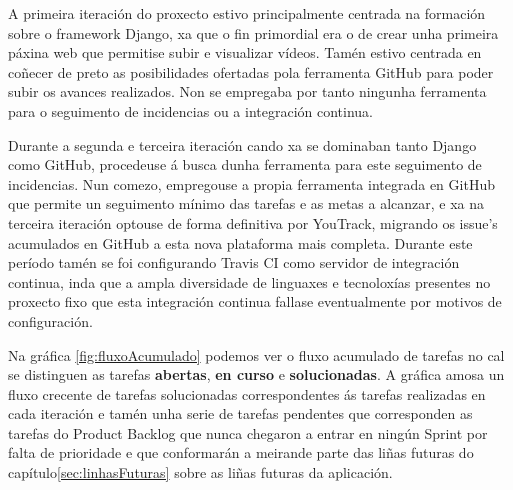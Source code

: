A primeira iteración do proxecto estivo principalmente centrada na formación sobre o framework
Django, xa que o fin primordial era o de crear unha primeira páxina web que permitise subir e 
visualizar vídeos. Tamén estivo centrada en coñecer de preto as posibilidades ofertadas pola
ferramenta GitHub para poder subir os avances realizados. Non se empregaba por tanto ningunha
ferramenta para o seguimento de incidencias ou a integración continua.

Durante a segunda e terceira iteración cando xa se dominaban tanto Django como GitHub, 
procedeuse á busca dunha ferramenta para este seguimento de incidencias. Nun comezo, empregouse
a propia ferramenta integrada en GitHub que permite un seguimento mínimo das tarefas e as metas
a alcanzar, e xa na terceira iteración optouse de forma definitiva por YouTrack, migrando os 
issue's acumulados en GitHub a esta nova plataforma mais completa. Durante este período tamén se
foi configurando Travis CI como servidor de integración continua, inda que a ampla diversidade
de linguaxes e tecnoloxías presentes no proxecto fixo que esta integración continua fallase 
eventualmente por motivos de configuración.


Na gráfica \ref{fig:fluxoAcumulado} podemos ver o fluxo acumulado de tarefas no cal se distinguen
as tarefas \textbf{abertas}, \textbf{en curso} e \textbf{solucionadas}. A gráfica amosa un fluxo 
crecente de tarefas solucionadas correspondentes ás tarefas realizadas en cada iteración e tamén 
unha serie de tarefas pendentes que corresponden as tarefas do Product Backlog que nunca chegaron
a entrar en ningún Sprint por falta de prioridade e que conformarán a meirande parte das liñas 
futuras do capítulo\ref{sec:linhasFuturas} sobre as liñas futuras da aplicación.

